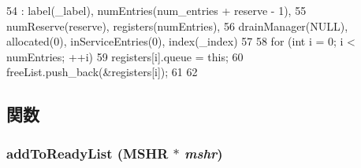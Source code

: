 \begin{DoxyCode}
54     : label(_label), numEntries(num_entries + reserve - 1),
55       numReserve(reserve), registers(numEntries),
56       drainManager(NULL), allocated(0), inServiceEntries(0), index(_index)
57 {
58     for (int i = 0; i < numEntries; ++i) {
59         registers[i].queue = this;
60         freeList.push_back(&registers[i]);
61     }
62 }
\end{DoxyCode}


\subsection{関数}
\hypertarget{classMSHRQueue_a80c2dad36455852eae13562756599fa4}{
\subsubsection[{addToReadyList}]{ addToReadyList ({\bf MSHR} $\ast$ {\em mshr})}}
\label{classMSHRQueue_a80c2dad36455852eae13562756599fa4}



